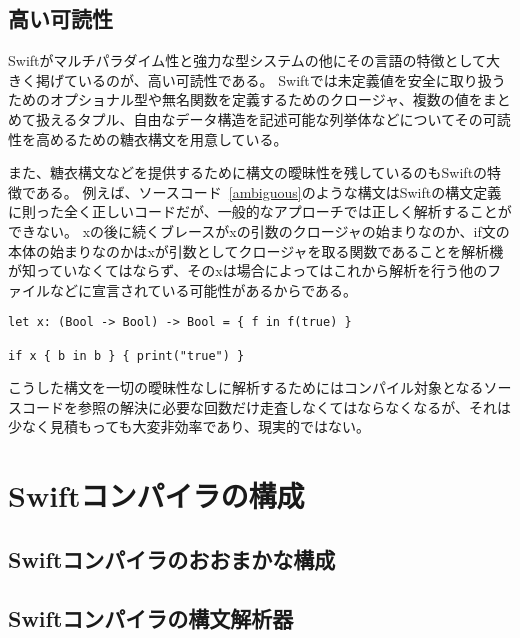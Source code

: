 \subsection{高い可読性}

Swiftがマルチパラダイム性と強力な型システムの他にその言語の特徴として大きく掲げているのが、高い可読性である。
Swiftでは未定義値を安全に取り扱うためのオプショナル型や無名関数を定義するためのクロージャ、複数の値をまとめて扱えるタプル、自由なデータ構造を記述可能な列挙体などについてその可読性を高めるための糖衣構文を用意している。

また、糖衣構文などを提供するために構文の曖昧性を残しているのもSwiftの特徴である。
例えば、ソースコード~\ref{ambiguous}のような構文はSwiftの構文定義に則った全く正しいコードだが、一般的なアプローチでは正しく解析することができない。
xの後に続くブレースがxの引数のクロージャの始まりなのか、if文の本体の始まりなのかはxが引数としてクロージャを取る関数であることを解析機が知っていなくてはならず、そのxは場合によってはこれから解析を行う他のファイルなどに宣言されている可能性があるからである。

\begin{lstlisting}[caption=曖昧な構文を持った正しいSwiftコード, label=ambiguous]
let x: (Bool -> Bool) -> Bool = { f in f(true) }

if x { b in b } { print("true") }
\end{lstlisting}

こうした構文を一切の曖昧性なしに解析するためにはコンパイル対象となるソースコードを参照の解決に必要な回数だけ走査しなくてはならなくなるが、それは少なく見積もっても大変非効率であり、現実的ではない。


\section{Swiftコンパイラの構成}
\label{explain-swift:structure}

\subsection{Swiftコンパイラのおおまかな構成}

\subsection{Swiftコンパイラの構文解析器}

